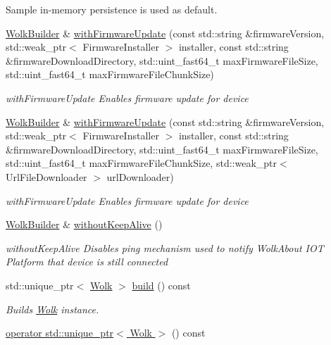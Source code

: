 \begin{DoxyCompactItemize}
\begin{DoxyCompactList}
 Sample in-\/memory persistence is used as default. \end{DoxyCompactList}\item 
\hyperlink{classwolkabout_1_1WolkBuilder}{Wolk\+Builder} \& \hyperlink{classwolkabout_1_1WolkBuilder_ae441661b8a61c4aaf8b7d9a794f0debc}{with\+Firmware\+Update} (const std\+::string \&firmware\+Version, std\+::weak\+\_\+ptr$<$ Firmware\+Installer $>$ installer, const std\+::string \&firmware\+Download\+Directory, std\+::uint\+\_\+fast64\+\_\+t max\+Firmware\+File\+Size, std\+::uint\+\_\+fast64\+\_\+t max\+Firmware\+File\+Chunk\+Size)
\begin{DoxyCompactList}\small\item\em with\+Firmware\+Update Enables firmware update for device \end{DoxyCompactList}\item 
\hyperlink{classwolkabout_1_1WolkBuilder}{Wolk\+Builder} \& \hyperlink{classwolkabout_1_1WolkBuilder_a72920612045d4ee812931320a13410c7}{with\+Firmware\+Update} (const std\+::string \&firmware\+Version, std\+::weak\+\_\+ptr$<$ Firmware\+Installer $>$ installer, const std\+::string \&firmware\+Download\+Directory, std\+::uint\+\_\+fast64\+\_\+t max\+Firmware\+File\+Size, std\+::uint\+\_\+fast64\+\_\+t max\+Firmware\+File\+Chunk\+Size, std\+::weak\+\_\+ptr$<$ Url\+File\+Downloader $>$ url\+Downloader)
\begin{DoxyCompactList}\small\item\em with\+Firmware\+Update Enables firmware update for device \end{DoxyCompactList}\item 
\hyperlink{classwolkabout_1_1WolkBuilder}{Wolk\+Builder} \& \hyperlink{classwolkabout_1_1WolkBuilder_a22893971f31f5dccb5dec0690324a038}{without\+Keep\+Alive} ()
\begin{DoxyCompactList}\small\item\em without\+Keep\+Alive Disables ping mechanism used to notify Wolk\+About I\+OT Platform that device is still connected \end{DoxyCompactList}\item 
std\+::unique\+\_\+ptr$<$ \hyperlink{classwolkabout_1_1Wolk}{Wolk} $>$ \hyperlink{classwolkabout_1_1WolkBuilder_aad4c9b0c925a023cf670dc2fdc6631f3}{build} () const 
\begin{DoxyCompactList}\small\item\em Builds \hyperlink{classwolkabout_1_1Wolk}{Wolk} instance. \end{DoxyCompactList}\item 
\hyperlink{classwolkabout_1_1WolkBuilder_a878d41186bd310862e90eecde01a6a1b}{operator std\+::unique\+\_\+ptr$<$ Wolk $>$} () const \hypertarget{classwolkabout_1_1WolkBuilder_a878d41186bd310862e90eecde01a6a1b}{}\label{classwolkabout_1_1WolkBuilder_a878d41186bd310862e90eecde01a6a1b}


\end{DoxyCompactItemize}
